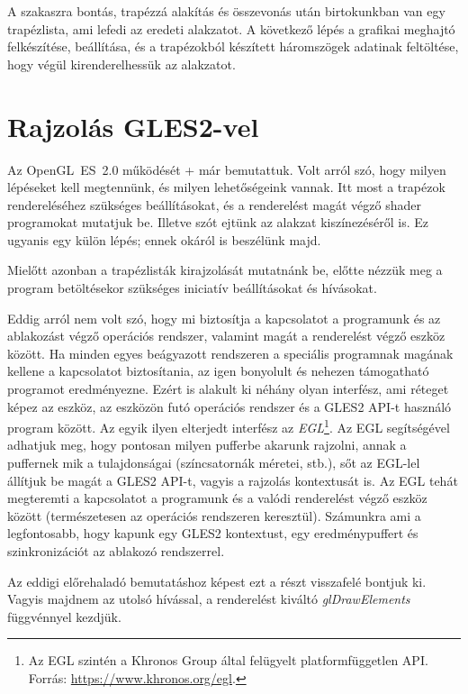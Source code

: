 \documentclass[12pt]{report}
\theoremstyle{definition}
\newcommand{\func}[1]{{\textsl{#1}}}
\begin{document}
A szakaszra bontás, trapézzá alakítás és összevonás után birtokunkban van egy
trapézlista, ami lefedi az eredeti alakzatot. A következő lépés a grafikai
meghajtó felkészítése, beállítása, és a trapézokból készített háromszögek
adatinak feltöltése, hogy végül kirenderelhessük az alakzatot.

  \section{Rajzolás GLES2-vel}

Az OpenGL~ES~2.0 működését \az+ már bemutattuk. Volt
arról szó, hogy milyen lépéseket kell megtennünk, és milyen lehetőségeink
vannak. Itt most a trapézok rendereléséhez szükséges beállításokat, és a
renderelést magát végző shader programokat mutatjuk be. Illetve szót ejtünk az
alakzat kiszínezéséről is. Ez ugyanis egy külön lépés; ennek okáról is
beszélünk majd.

Mielőtt azonban a trapézlisták kirajzolását mutatnánk be, előtte nézzük meg a
program betöltésekor szükséges iniciatív beállításokat és hívásokat.

Eddig arról nem volt szó, hogy mi biztosítja a kapcsolatot a programunk és az
ablakozást végző operációs rendszer, valamint magát a renderelést végző eszköz
között. Ha minden egyes beágyazott rendszeren a speciális programnak magának
kellene a kapcsolatot biztosítania, az igen bonyolult és nehezen támogatható
programot eredményezne. Ezért is alakult ki néhány olyan interfész, ami réteget
képez az eszköz, az eszközön futó operációs rendszer és a GLES2 API-t használó
program között. Az egyik ilyen elterjedt interfész az \emph{EGL}\footnote{Az
EGL szintén a Khronos Group által felügyelt platformfüggetlen API. \\ Forrás:
{\footnotesize\url{https://www.khronos.org/egl}}.}. Az EGL segítségével
adhatjuk meg, hogy pontosan milyen pufferbe akarunk rajzolni, annak a puffernek
mik a tulajdonságai (színcsatornák méretei, stb.), sőt az EGL-lel állítjuk be
magát a GLES2 API-t, vagyis a rajzolás kontextusát is. Az EGL tehát megteremti
a kapcsolatot a programunk és a valódi renderelést végző eszköz között
(természetesen az operációs rendszeren keresztül). Számunkra ami a
legfontosabb, hogy kapunk egy GLES2 kontextust, egy eredménypuffert és
szinkronizációt az ablakozó rendszerrel.

Az eddigi előrehaladó bemutatáshoz képest ezt a részt visszafelé bontjuk ki.
Vagyis majdnem az utolsó hívással, a renderelést kiváltó \func{glDrawElements}
függvénnyel kezdjük.
\end{document}
